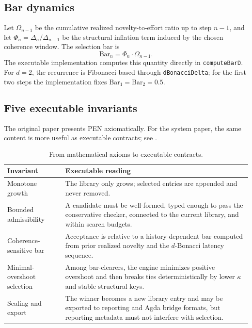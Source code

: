\documentclass[11pt,a4paper]{article}
\begin{document}
\subsection{Bar dynamics}

Let $\Omega_{n-1}$ be the cumulative realized novelty-to-effort ratio up to step $n-1$, and let $\Phi_n=\Delta_n/\Delta_{n-1}$ be the structural inflation term induced by the chosen coherence window. The selection bar is
\[
\mathrm{Bar}_n=\Phi_n\cdot \Omega_{n-1}.
\]
The executable implementation computes this quantity directly in \texttt{computeBarD}. For $d=2$, the recurrence is Fibonacci-based through \texttt{dBonacciDelta}; for the first two steps the implementation fixes $\mathrm{Bar}_1=\mathrm{Bar}_2=0.5$.

\subsection{Five executable invariants}

The original paper presents PEN axiomatically. For the system paper, the same content is more useful as executable contracts; see .

\begin{table}[H]
\centering
\caption{From mathematical axioms to executable contracts.}
\label{tab:axioms-contracts}
\small
\begin{tabular}{@{}p{2.7cm}p{9.8cm}@{}}
\toprule
Invariant & Executable reading \\
\midrule
Monotone growth & The library only grows; selected entries are appended and never removed. \\
Bounded admissibility & A candidate must be well-formed, typed enough to pass the conservative checker, connected to the current library, and within search budgets. \\
Coherence-sensitive bar & Acceptance is relative to a history-dependent bar computed from prior realized novelty and the $d$-Bonacci latency sequence. \\
Minimal-overshoot selection & Among bar-clearers, the engine minimizes positive overshoot and then breaks ties deterministically by lower $\kappa$ and stable structural keys. \\
Sealing and export & The winner becomes a new library entry and may be exported to reporting and Agda bridge formats, but reporting metadata must not interfere with selection. \\
\bottomrule
\end{tabular}
\end{table}
\end{document}
